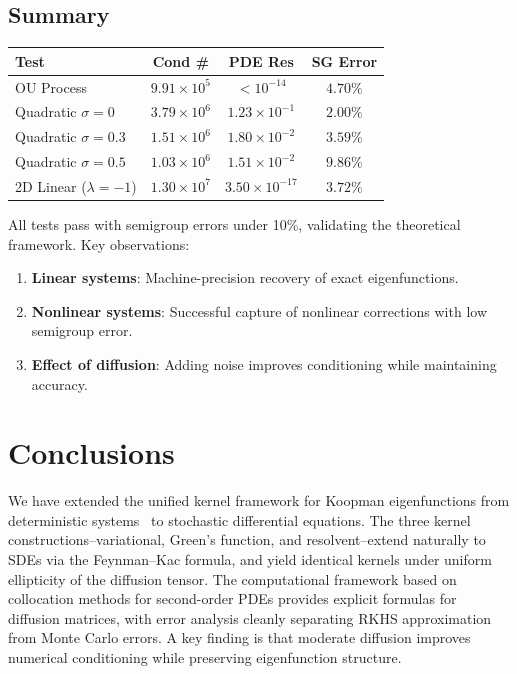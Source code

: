 \documentclass[11pt,a4paper]{article}
\begin{document}
\subsection{Summary}

\begin{center}
\begin{tabular}{lccc}
\toprule
\textbf{Test} & \textbf{Cond \#} & \textbf{PDE Res} & \textbf{SG Error}   \\
\midrule
OU Process & $9.91\times 10^5$ & $< 10^{-14}$ & $4.70\%$   \\
Quadratic $\sigma=0$ & $3.79\times 10^6$ & $1.23\times 10^{-1}$ & $2.00\%$   \\
Quadratic $\sigma=0.3$ & $1.51\times 10^6$ & $1.80\times 10^{-2}$ & $3.59\%$   \\
Quadratic $\sigma=0.5$ & $1.03\times 10^6$ & $1.51\times 10^{-2}$ & $9.86\%$   \\
2D Linear ($\lambda=-1$) & $1.30\times 10^7$ & $3.50\times 10^{-17}$ & $3.72\%$   \\
\bottomrule
\end{tabular}
\end{center}

All tests pass with semigroup errors under 10\%, validating the theoretical framework. Key observations:
\begin{enumerate}
    \item \textbf{Linear systems}: Machine-precision recovery of exact eigenfunctions.
    \item \textbf{Nonlinear systems}: Successful capture of nonlinear corrections with low semigroup error.
    \item \textbf{Effect of diffusion}: Adding noise improves conditioning while maintaining accuracy.
\end{enumerate}

\section{Conclusions}\label{sec:conclusions}

We have extended the unified kernel framework for Koopman eigenfunctions from deterministic systems~\cite{HamziOwhadiVaidya2024} to stochastic differential equations. The three kernel constructions--variational, Green's function, and resolvent--extend naturally to SDEs via the Feynman--Kac formula, and yield identical kernels under uniform ellipticity of the diffusion tensor. The computational framework based on collocation methods for second-order PDEs provides explicit formulas for diffusion matrices, with error analysis cleanly separating RKHS approximation from Monte Carlo errors. A key finding is that moderate diffusion improves numerical conditioning while preserving eigenfunction structure.
\end{document}
